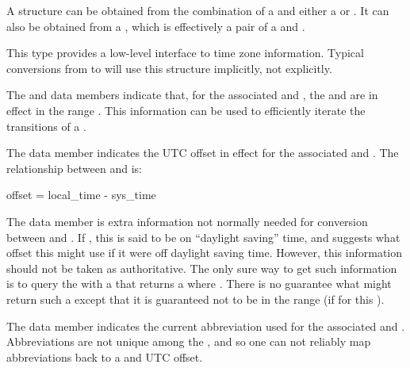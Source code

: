 \pnum
A  structure can be obtained
from the combination of a  and
either a  or .
It can also be obtained from a ,
which is effectively a pair of a  and .

\pnum
\begin{note}
This type provides a low-level interface to time zone information.
Typical conversions from  to 
will use this structure implicitly, not explicitly.
\end{note}

\pnum
{}%
%
The  and  data members indicate that,
for the associated  and ,
the  and  are in effect in the range .
This information can be used to efficiently iterate the transitions of a .

\pnum
{}%
The  data member indicates
the UTC offset in effect
for the associated  and .
The relationship between  and  is:

\begin{codeblock}
offset = local_time - sys_time
\end{codeblock}

\pnum
{}%
The  data member is extra information not normally needed
for conversion between  and .
If , this  is said to be on ``daylight saving'' time,
and  suggests what offset this  might use
if it were off daylight saving time.
However, this information should not be taken as authoritative.
The only sure way to get such information
is to query the  with a 
that returns a  where .
There is no guarantee what  might return such a 
except that it is guaranteed not to be in the range 
(if  for this ).

\pnum
{}%
The  data member indicates
the current abbreviation used for the associated  and .
Abbreviations are not unique among the ,
and so one can not reliably map abbreviations back to a  and UTC offset.

